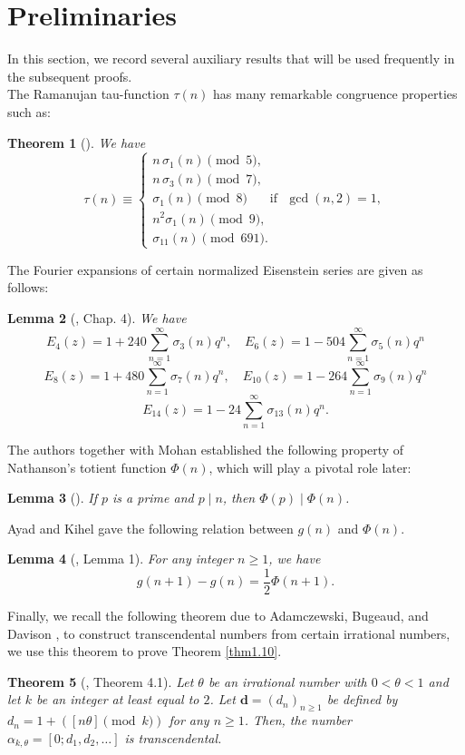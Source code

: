 \documentclass[12pt,reqno]{amsart}
\newtheorem{theorem}{Theorem}[section]
\newtheorem{lemma} [theorem]{Lemma}
\begin{document}
\section{Preliminaries}\label{sec2}
In this section, we record several auxiliary results that will be used frequently in the subsequent proofs.\\
The Ramanujan tau-function $\tau(n)$ has many remarkable congruence properties such as:
\begin{theorem}[\cite{newnew, new1,murty}]\label{murty}We have
\noindent
$$\tau(n) \equiv
\begin{cases}
n\,\sigma_{1}(n) \pmod{5},\\[6pt]
n\,\sigma_{3}(n) \pmod{7},\\[6pt]
\sigma_1(n) \pmod{8}~~\text{~~~~if~~}\gcd(n,2)=1,\\[6pt]
n^{2}\sigma_{1}(n) \pmod{9},\\[6pt]
\sigma_{11}(n) \pmod{691}.
\end{cases}$$
\end{theorem}
The Fourier expansions of certain normalized Eisenstein series are given as follows:
\begin{lemma}[\cite{murty}, Chap. 4]\label{lemma es}
We have
$$E_4(z) = 1 + 240 \sum_{n=1}^{\infty} \sigma_3(n) q^n, \quad E_6(z) = 1 - 504 \sum_{n=1}^{\infty} \sigma_5(n) q^n$$
$$E_8(z) = 1 + 480 \sum_{n=1}^{\infty} \sigma_7(n) q^n,\quad E_{10}(z) = 1 - 264 \sum_{n=1}^{\infty} \sigma_9(n) q^n$$
$$E_{14}(z) = 1 - 24 \sum_{n=1}^{\infty} \sigma_{13}(n) q^n.$$
\end{lemma}
The authors together with Mohan \cite{r2} established the following property of Nathanson’s totient function $\Phi(n)$, which will play a pivotal role later:
\begin{lemma}[\cite{r2}]\label{c1}
    If $p$ is a prime and $p \mid n$, then $\Phi(p)\mid \Phi(n)$.
\end{lemma}
Ayad and Kihel \cite{r1} gave the following relation between $g(n)$ and $\Phi(n)$.
\begin{lemma}[\cite{r1}, Lemma 1]\label{lemma1.5}
For any integer $n\geq1$, we have 
$$g(n+1)-g(n)=\frac{1}{2}\Phi(n+1).$$
\end{lemma}

Finally, we recall the following theorem due to Adamczewski, Bugeaud, and Davison \cite{r4}, to construct transcendental numbers from certain irrational numbers, we use this theorem to prove Theorem \ref{thm1.10}.
\begin{theorem}[\cite{r4}, Theorem 4.1]\label{thm*}
Let $\theta$ be an irrational number with $0<\theta<1$ and let $k$ be an integer at least equal to $2$. Let $\textbf{d}=(d_n)_{n\geq1}$ be defined by $d_n=1+([n\theta] \pmod k)$ for any $n\geq1$. Then, the number $\alpha_{k,\theta}=[0;d_1,d_2,\ldots]$ is transcendental.
\end{theorem}
\end{document}

